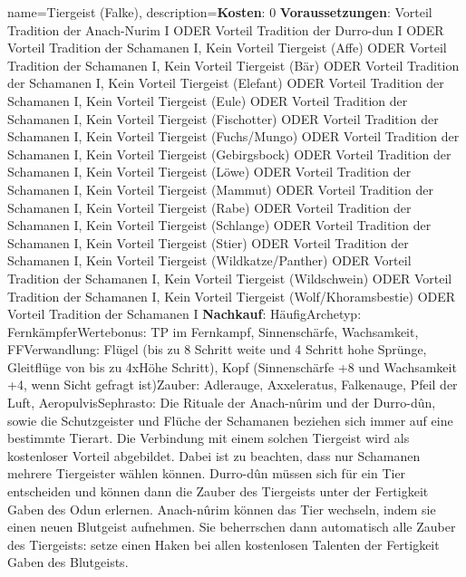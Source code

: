 {
    name={Tiergeist (Falke)},
    description={\textbf{Kosten}: 0 \textbf{Voraussetzungen}: Vorteil Tradition der Anach-Nurim I ODER Vorteil Tradition der Durro-dun I ODER Vorteil Tradition der Schamanen I, Kein Vorteil Tiergeist (Affe) ODER Vorteil Tradition der Schamanen I, Kein Vorteil Tiergeist (Bär) ODER Vorteil Tradition der Schamanen I, Kein Vorteil Tiergeist (Elefant) ODER Vorteil Tradition der Schamanen I, Kein Vorteil Tiergeist (Eule) ODER Vorteil Tradition der Schamanen I, Kein Vorteil Tiergeist (Fischotter) ODER Vorteil Tradition der Schamanen I, Kein Vorteil Tiergeist (Fuchs/Mungo) ODER Vorteil Tradition der Schamanen I, Kein Vorteil Tiergeist (Gebirgsbock) ODER Vorteil Tradition der Schamanen I, Kein Vorteil Tiergeist (Löwe) ODER Vorteil Tradition der Schamanen I, Kein Vorteil Tiergeist (Mammut) ODER Vorteil Tradition der Schamanen I, Kein Vorteil Tiergeist (Rabe) ODER Vorteil Tradition der Schamanen I, Kein Vorteil Tiergeist (Schlange) ODER Vorteil Tradition der Schamanen I, Kein Vorteil Tiergeist (Stier) ODER Vorteil Tradition der Schamanen I, Kein Vorteil Tiergeist (Wildkatze/Panther) ODER Vorteil Tradition der Schamanen I, Kein Vorteil Tiergeist (Wildschwein) ODER Vorteil Tradition der Schamanen I, Kein Vorteil Tiergeist (Wolf/Khoramsbestie) ODER Vorteil Tradition der Schamanen I \textbf{Nachkauf}: Häufig\newline Archetyp: Fernkämpfer\newline Wertebonus: TP im Fernkampf, Sinnenschärfe, Wachsamkeit, FF\newline Verwandlung: Flügel (bis zu 8 Schritt weite und 4 Schritt hohe Sprünge, Gleitflüge von bis zu 4xHöhe Schritt), Kopf (Sinnenschärfe +8 und Wachsamkeit +4, wenn Sicht gefragt ist)\newline Zauber: Adlerauge, Axxeleratus, Falkenauge, Pfeil der Luft, Aeropulvis\newline Sephrasto: Die Rituale der Anach-nûrim und der Durro-dûn, sowie die Schutzgeister und Flüche der Schamanen beziehen sich immer auf eine bestimmte Tierart. Die Verbindung mit einem solchen Tiergeist wird als kostenloser Vorteil abgebildet. Dabei ist zu beachten, dass nur Schamanen mehrere Tiergeister wählen können. Durro-dûn müssen sich für ein Tier entscheiden und können dann die Zauber des Tiergeists unter der Fertigkeit Gaben des Odun erlernen. Anach-nûrim können das Tier wechseln, indem sie einen neuen Blutgeist aufnehmen. Sie beherrschen dann automatisch alle Zauber des Tiergeists: setze einen Haken bei allen kostenlosen Talenten der Fertigkeit Gaben des Blutgeists.}
}


